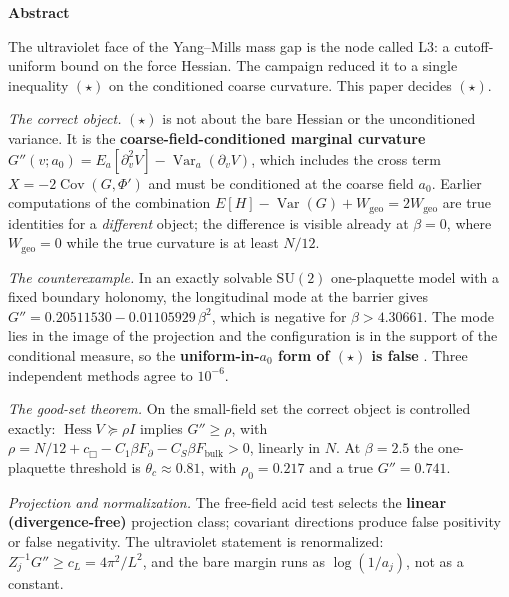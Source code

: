 \documentclass[11pt,a4paper]{article}
\newcommand{\labb}[2]{\fcolorbox{#1!35}{#1!8}{\textcolor{#1}{\textbf{\scriptsize #2}}}}
\newcommand{\LN}{\labb{cN}{N}}
\begin{document}
\begin{tcolorbox}[enhanced, breakable, colback=white, colframe=white, boxrule=0pt,
  left=6pt, right=6pt, top=4pt, bottom=4pt, parbox=false]
\begin{center}{\large\bfseries Abstract}\end{center}
\footnotesize
\setlength{\parskip}{0pt}
The ultraviolet face of the Yang--Mills mass gap is the node called L3: a cutoff-uniform bound on
the force Hessian. The campaign reduced it to a single inequality $(\star)$ on the conditioned
coarse curvature. This paper decides $(\star)$.

\emph{The correct object.} $(\star)$ is not about the bare Hessian or the unconditioned variance.
It is the \textbf{coarse-field-conditioned marginal curvature}
$G''(v;a_0)=E_a[\partial_v^2V]-\operatorname{Var}_a(\partial_vV)$, which includes the cross term
$X=-2\operatorname{Cov}(G,\Phi')$ and must be conditioned at the coarse field $a_0$. Earlier
computations of the combination $E[H]-\operatorname{Var}(G)+W_{\mathrm{geo}}=2W_{\mathrm{geo}}$ are
true identities for a \emph{different} object; the difference is visible already at $\beta=0$,
where $W_{\mathrm{geo}}=0$ while the true curvature is at least $N/12$.

\emph{The counterexample.} In an exactly solvable $\mathrm{SU}(2)$ one-plaquette model with a fixed
boundary holonomy, the longitudinal mode at the barrier gives
$G''=0.20511530-0.01105929\,\beta^2$, which is negative for $\beta>4.30661$. The mode lies in the
image of the projection and the configuration is in the support of the conditional measure, so the
\textbf{uniform-in-$a_0$ form of $(\star)$ is false} \LN. Three independent methods agree to
$10^{-6}$.

\emph{The good-set theorem.} On the small-field set the correct object is controlled exactly:
$\operatorname{Hess}V\succeq\rho I$ implies $G''\ge\rho$, with
$\rho=N/12+c_\Box-C_1\beta F_\partial-C_S\beta F_{\mathrm{bulk}}>0$, linearly in $N$. At
$\beta=2.5$ the one-plaquette threshold is $\theta_c\approx0.81$, with $\rho_0=0.217$ and a true
$G''=0.741$.

\emph{Projection and normalization.} The free-field acid test selects the \textbf{linear
(divergence-free)} projection class; covariant directions produce false positivity or false
negativity. The ultraviolet statement is renormalized: $Z_j^{-1}G''\ge c_L=4\pi^2/L^2$, and the
bare margin runs as $\log(1/a_j)$, not as a constant.


\end{tcolorbox}
\end{document}

